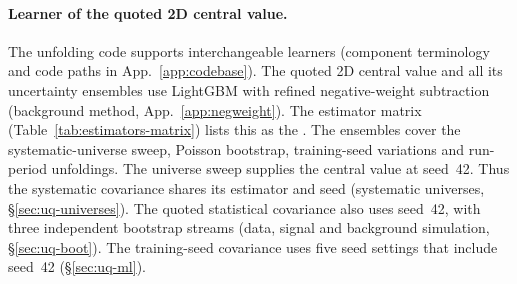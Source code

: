 \paragraph{Learner of the quoted 2D central value.} The unfolding code supports interchangeable learners (component terminology and code paths in App.~\ref{app:codebase}). The quoted 2D central value and all its uncertainty ensembles use LightGBM with refined negative-weight subtraction (background method, App.~\ref{app:negweight}). The estimator matrix (Table~\ref{tab:estimators-matrix}) lists this as the \estTwoD{}. The ensembles cover the systematic-universe sweep, Poisson bootstrap, training-seed variations and run-period unfoldings. The universe sweep supplies the central value at seed~42. Thus the systematic covariance shares its estimator and seed (systematic universes, \S\ref{sec:uq-universes}). The quoted statistical covariance also uses seed~42, with three independent bootstrap streams (data, signal and background simulation, \S\ref{sec:uq-boot}). The training-seed covariance uses five seed settings that include seed~42 (\S\ref{sec:uq-ml}).

